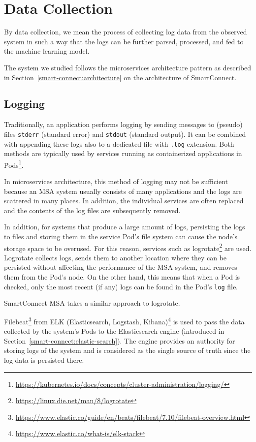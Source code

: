 \section{Data Collection}
\label{data_collection}
By data collection, we mean the process of collecting log data from the observed system in such a way that the logs can be further parsed, processed, and fed to the machine learning model.

The system we studied follows the microservices architecture pattern as described in Section~\ref{smart-connect:architecture} on the architecture of SmartConnect.\\

\subsection{Logging}

Traditionally, an application performs logging by sending messages to
(pseudo) files \texttt{stderr} (standard error) and \texttt{stdout} (standard output). It can be combined with appending these logs also to a dedicated file with \texttt{.log} extension. Both methods are typically used by services running as containerized applications in Pods\footnote{\url{https://kubernetes.io/docs/concepts/cluster-administration/logging/}}.

In microservices architecture, this method of logging may not be sufficient because an MSA system usually consists of many applications and the logs are scattered in many places. In addition, the individual services are often replaced and the contents of the log files are subsequently removed.

In addition, for systems that produce a large amount of logs, persisting the logs to files and storing them in the service Pod's file system can cause the node's storage space to be overused. For this reason, services such as logrotate\footnote{\url{https://linux.die.net/man/8/logrotate}} are used. Logrotate collects logs, sends them to another location where they can be persisted without affecting the performance of the MSA system, and removes them from the Pod's node. On the other hand, this means that when a Pod is checked, only the most recent (if any) logs can be found in the Pod's \texttt{log} file.

SmartConnect MSA takes a similar approach to logrotate.

Filebeat\footnote{\url{https://www.elastic.co/guide/en/beats/filebeat/7.10/filebeat-overview.html}} from ELK (Elasticsearch, Logstash, Kibana)\footnote{\url{https://www.elastic.co/what-is/elk-stack}} is used to pass the data collected by the system's Pods to the Elasticsearch engine (introduced in Section~\ref{smart-connect:elastic-search}). 
The engine provides an authority for storing logs of the system and is considered as the single source of truth since the log data is persisted there.

